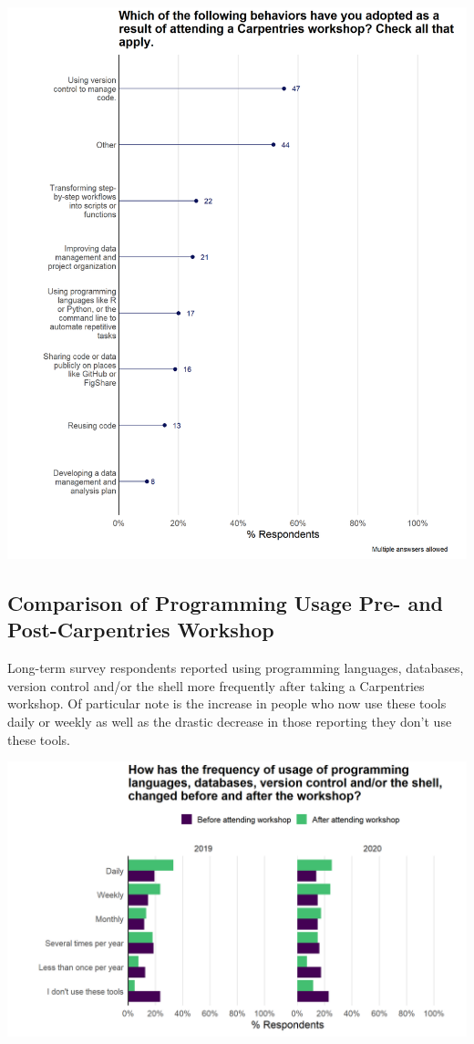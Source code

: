 \documentclass[
]{article}
\makeatletter
\def\maxwidth{\ifdim\Gin@nat@width>\linewidth\linewidth\else\Gin@nat@width\fi}
\makeatother
\begin{document}
\includegraphics[width=\maxwidth]{../figures/2020-12-longterm-behavior_adopted-1}

\hypertarget{comparison-of-programming-usage-pre--and-post-carpentries-workshop}{%
\subsection{Comparison of Programming Usage Pre- and Post-Carpentries
Workshop}\label{comparison-of-programming-usage-pre--and-post-carpentries-workshop}}

Long-term survey respondents reported using programming languages,
databases, version control and/or the shell more frequently after taking
a Carpentries workshop. Of particular note is the increase in people who
now use these tools daily or weekly as well as the drastic decrease in
those reporting they don't use these tools.

\includegraphics[width=\maxwidth]{../figures/2020-12-longterm-change_usage_frequency-1}
\end{document}
